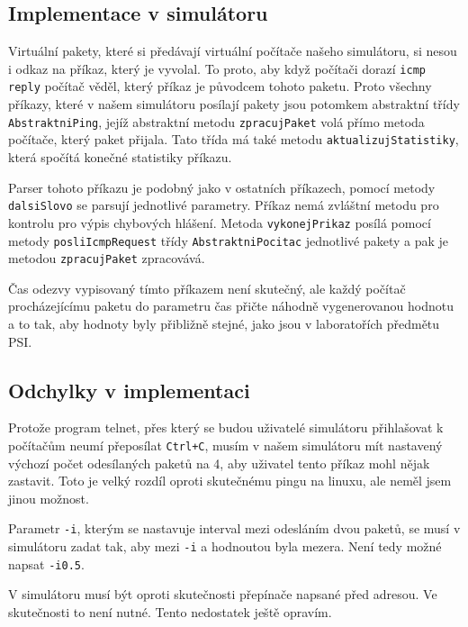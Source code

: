 \subsection{Implementace v simulátoru}

Virtuální pakety, které si předávají virtuální počítače našeho simulátoru, si nesou i odkaz na příkaz, který je vyvolal. To proto, aby když počítači dorazí \verb|icmp reply| počítač věděl, který příkaz je původcem tohoto paketu. Proto všechny příkazy, které v našem simulátoru posílají pakety jsou potomkem abstraktní třídy \verb|AbstraktniPing|, jejíž abstraktní metodu \verb|zpracujPaket| volá přímo metoda počítače, který paket přijala. Tato třída má také metodu \verb|aktualizujStatistiky|, která spočítá konečné statistiky příkazu.

Parser tohoto příkazu je podobný jako v ostatních příkazech, pomocí metody \verb|dalsiSlovo| se parsují jednotlivé parametry. Příkaz nemá zvláštní metodu pro kontrolu pro výpis chybových hlášení. Metoda \verb|vykonejPrikaz| posílá pomocí metody \verb|posliIcmpRequest| třídy \verb|AbstraktniPocitac| jednotlivé pakety a pak je metodou \verb|zpracujPaket| zpracovává.

Čas odezvy vypisovaný tímto příkazem není skutečný, ale každý počítač procházejícímu paketu do parametru čas přičte náhodně vygenerovanou hodnotu a to tak, aby hodnoty byly přibližně stejné, jako jsou v laboratořích předmětu PSI.


\subsection{Odchylky v implementaci}

Protože program telnet, přes který se budou uživatelé simulátoru přihlašovat k počítačům neumí přeposílat \verb|Ctrl+C|, musím v našem simulátoru mít nastavený výchozí počet odesílaných paketů na 4, aby uživatel tento příkaz mohl nějak zastavit. Toto je velký rozdíl oproti skutečnému pingu na linuxu, ale neměl jsem jinou možnost.

Parametr \verb|-i|, kterým se nastavuje interval mezi odesláním dvou paketů, se musí v simulátoru zadat tak, aby mezi \verb|-i| a hodnoutou byla mezera. Není tedy možné napsat \verb|-i0.5|.

V simulátoru musí být oproti skutečnosti přepínače napsané před adresou. Ve skutečnosti to není nutné. Tento nedostatek ještě opravím.




